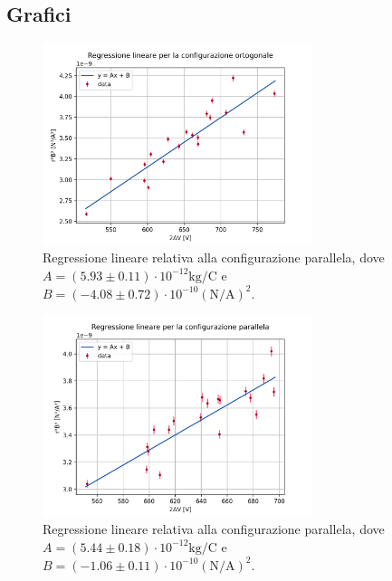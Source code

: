 \documentclass[]{article}
\let\oldsubsection\subsection%
\renewcommand{\subsection}{%
	\renewcommand{\theequation}{\thesubsection.\arabic{equation}}%
	\oldsubsection}%
\begin{document}
\subsection{Grafici}
\begin{figure}[h]
    \centering
    \includegraphics[width=0.70\textwidth]{plot/graph_ort.png}
    \caption{Regressione lineare relativa alla configurazione parallela, dove $A=(5.93 \pm 0.11) \cdot 10^{-12}\text{kg/C}$ e $B = (-4.08 \pm 0.72) \cdot 10^{-10} (\text{N/A})^2$.}
    \label{graph_ort}
\end{figure}

\begin{figure}[h]
    \centering
    \includegraphics[width=0.70\textwidth]{plot/graph_par.png}
    \caption{Regressione lineare relativa alla configurazione parallela, dove $A=(5.44 \pm 0.18) \cdot 10^{-12}\text{kg/C}$ e $B = (-1.06 \pm 0.11) \cdot 10^{-10} (\text{N/A})^2$.}
    \label{graph_par}
\end{figure}
\end{document}
